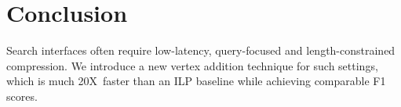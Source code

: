 \documentclass[11pt,a4paper]{article}
\newcommand{\speedup}[0]{20X~}
\begin{document}
\section{Conclusion}

Search interfaces often require low-latency, query-focused and length-constrained compression. We introduce a new vertex addition technique for such settings, which is much \speedup faster than an ILP baseline while achieving comparable F1 scores. 



%



\end{document}
